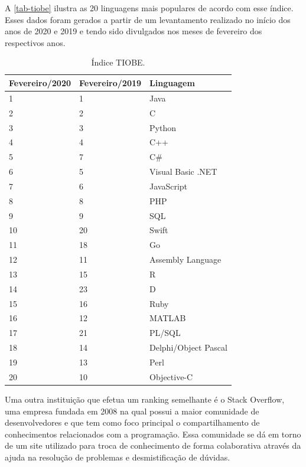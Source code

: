 A \autoref{tab-tiobe} ilustra as 20 linguagens mais populares de acordo com esse índice. Esses dados foram gerados a partir de um levantamento realizado no início dos anos de 2020 e 2019 e tendo sido divulgados nos meses de fevereiro dos respectivos anos.

\begin{table}[htb]
\ABNTEXfontereduzida
\caption[Índice TIOBE]{Índice TIOBE.}
\label{tab-tiobe}
\begin{tabular}{p{2.6cm}|p{2.6cm}|p{4cm}}
   \textbf{Fevereiro/2020} & \textbf{Fevereiro/2019}  & \textbf{Linguagem}  \\
    \hline
    1 & 1 & Java \\
    \hline
    2 & 2 & C \\
    \hline
    3 & 3 & Python \\
    \hline
    4 & 4 & C++ \\
    \hline
    5 & 7 & C\# \\
    \hline
    6 & 5 & Visual Basic .NET \\
    \hline
    7 & 6 & JavaScript \\
    \hline
    8 & 8 & PHP \\
    \hline
    9 & 9 & SQL \\
    \hline
    10 & 20 & Swift \\
    \hline
    11 & 18 & Go \\
    \hline
    12 & 11 & Assembly Language \\
    \hline
    13 & 15 & R \\
    \hline
    14 & 23 & D \\
    \hline
    15 & 16 & Ruby \\
    \hline
    16 & 12 & MATLAB \\
    \hline
    17 & 21 & PL/SQL \\
    \hline
    18 & 14 & Delphi/Object Pascal \\
    \hline
    19 & 13 & Perl \\
    \hline
    20 & 10 & Objective-C \\
\end{tabular}
\end{table}

\newpage
Uma outra instituição que efetua um ranking semelhante é o Stack Overflow\cite{stackOverflowAbout}, uma empresa fundada em 2008 na qual possui a maior comunidade de desenvolvedores e que tem como foco principal o compartilhamento de conhecimentos relacionados com a programação. Essa comunidade se dá em torno de um site utilizado para troca de conhecimento de forma colaborativa através da ajuda na resolução de problemas e desmistificação de dúvidas.

